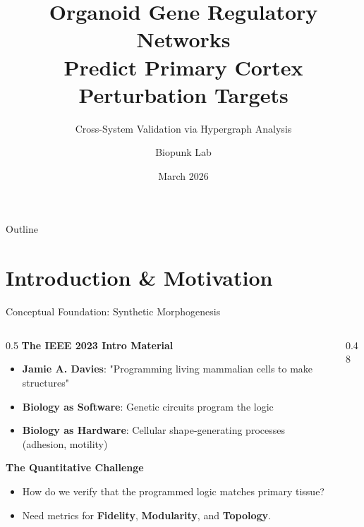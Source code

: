 \documentclass[aspectratio=169,11pt]{beamer}
\title{Organoid Gene Regulatory Networks\\Predict Primary Cortex Perturbation Targets}
\subtitle{Cross-System Validation via Hypergraph Analysis}
\author{Biopunk Lab}
\date{March 2026}
\institute{}
\newcommand{\hgx}{\texttt{hgx}}
\begin{document}

\begin{frame}
\titlepage
\end{frame}


\begin{frame}{Outline}
\tableofcontents
\end{frame}

\section{Introduction \& Motivation}

\begin{frame}{Conceptual Foundation: Synthetic Morphogenesis}

\begin{columns}[T]
\begin{column}{0.5\textwidth}
\textbf{The IEEE 2023 Intro Material}
\begin{itemize}
    \item \textbf{Jamie A. Davies}: "Programming living mammalian cells to make structures"
    \item \textbf{Biology as Software}: Genetic circuits program the logic
    \item \textbf{Biology as Hardware}: Cellular shape-generating processes (adhesion, motility)
\end{itemize}

\vspace{1em}
\textbf{The Quantitative Challenge}
\begin{itemize}
    \item How do we verify that the programmed logic matches primary tissue?
    \item Need metrics for \textbf{Fidelity}, \textbf{Modularity}, and \textbf{Topology}.
\end{itemize}
\end{column}

\begin{column}{0.48\textwidth}
\end{column}
\end{columns}

\end{frame}
\end{document}

